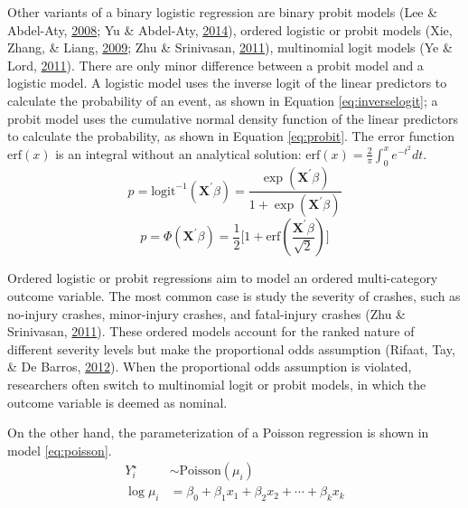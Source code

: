 \documentclass[12pt]{book}
\numberwithin{equation}{chapter}
\begin{document}
Other variants of a binary logistic regression are binary probit models (Lee \& Abdel-Aty, \protect\hyperlink{ref-lee2008presence}{2008}; Yu \& Abdel-Aty, \protect\hyperlink{ref-yu2014using}{2014}), ordered logistic or probit models (Xie, Zhang, \& Liang, \protect\hyperlink{ref-xie2009crash}{2009}; Zhu \& Srinivasan, \protect\hyperlink{ref-zhu2011comprehensive}{2011}), multinomial logit models (Ye \& Lord, \protect\hyperlink{ref-ye2011investigation}{2011}). There are only minor difference between a probit model and a logistic model. A logistic model uses the inverse logit of the linear predictors to calculate the probability of an event, as shown in Equation \eqref{eq:inverselogit}; a probit model uses the cumulative normal density function of the linear predictors to calculate the probability, as shown in Equation \eqref{eq:probit}. The error function \(\text{erf}(x)\) is an integral without an analytical solution: \(\text{erf}(x) = \frac{2}{\pi}\int_0^xe^{-t^2}dt\).
\begin{equation}
p = \text{logit}^{-1}(\mathbf{X}^\prime\beta) = \frac{\exp (\mathbf{X}^\prime\beta)}{1 + \exp (\mathbf{X}^\prime\beta)}
\label{eq:inverselogit}
\end{equation}
\begin{equation}
p = \Phi(\mathbf{X}^\prime\beta) = \frac{1}{2}\Big[1+\text{erf}(\frac{\mathbf{X}^\prime\beta}{\sqrt 2})\Big]
\label{eq:probit}
\end{equation}

Ordered logistic or probit regressions aim to model an ordered multi-category outcome variable. The most common case is study the severity of crashes, such as no-injury crashes, minor-injury crashes, and fatal-injury crashes (Zhu \& Srinivasan, \protect\hyperlink{ref-zhu2011comprehensive}{2011}). These ordered models account for the ranked nature of different severity levels but make the proportional odds assumption (Rifaat, Tay, \& De Barros, \protect\hyperlink{ref-rifaat2012severity}{2012}). When the proportional odds assumption is violated, researchers often switch to multinomial logit or probit models, in which the outcome variable is deemed as nominal.

On the other hand, the parameterization of a Poisson regression is shown in model \eqref{eq:poisson}.
\begin{equation}
\begin{split}
Y_i^\star & \sim \text{Poisson}(\mu_i) \\
\log\mu_i & = \beta_0 + \beta_1x_1 + \beta_2x_2 + \cdots + \beta_kx_k
\label{eq:poisson}
\end{split}
\end{equation}
\end{document}
